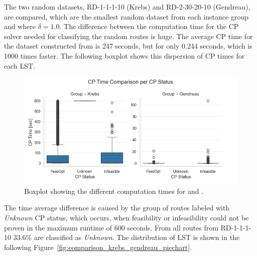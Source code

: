The two random datasets, RD-1-1-1-10 (Krebs) and RD-2-30-20-10 (Gendreau), are compared, which are the smallest random dataset from each instance group and
where $\delta = 1.0$. The difference between the computation time for the \gls{CP} solver needed for classifying the random routes is huge. The average
\gls{CP} time for the dataset constructed from \krebsADataSetText is 247 seconds, but for \gendreauDataSetText only 0.244 seconds,
which is 1000 times faster. The following boxplot shows this dispersion of \gls{CP} times for each \gls{LST}.
\begin{figure}[ht]
	\centering
	\includegraphics[width=\textwidth]{pictures/comparison_krebs_gendreau/boxplot_cp_time.png}
	\caption{Boxplot showing the different computation times for \krebsADataSetText and \gendreauDataSet.}
	\label{fig:comparison_krebs_gendreau_boxplot}
\end{figure}

The time average difference is caused by the group of routes labeled with \textit{Unknown} \gls{CP} status, which occurs, when
feasibility or infeasibility could not be proven in the maximum runtime of 600 seconds. From all routes from RD-1-1-1-10
33.6\% are classified as \textit{Unknown}. The distribution of \gls{LST} is shown in the following Figure~\ref{fig:comparison_krebs_gendreau_piechart}.

